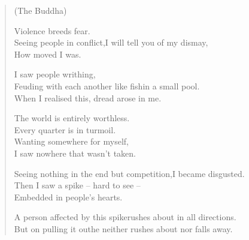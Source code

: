 
\begin{verse}

(The Buddha)

 Violence breeds fear.\\
Seeing people in conflict,\newline I will tell you of my dismay,\\
How moved I was.


 I saw people writhing,\\
Feuding with each another like fish\newline in a small pool.\\
When I realised this, dread arose in me.


 The world is entirely worthless.\\
Every quarter is in turmoil.\\
Wanting somewhere for myself,\\
I saw nowhere that wasn't taken.


 Seeing nothing in the end but competition,\newline I became disgusted.\\
Then I saw a spike -- hard to see --\\
Embedded in people's hearts.


 A person affected by this spike\newline rushes about in all directions.\\
But on pulling it out\newline he neither rushes about nor falls away.


\end{verse}
